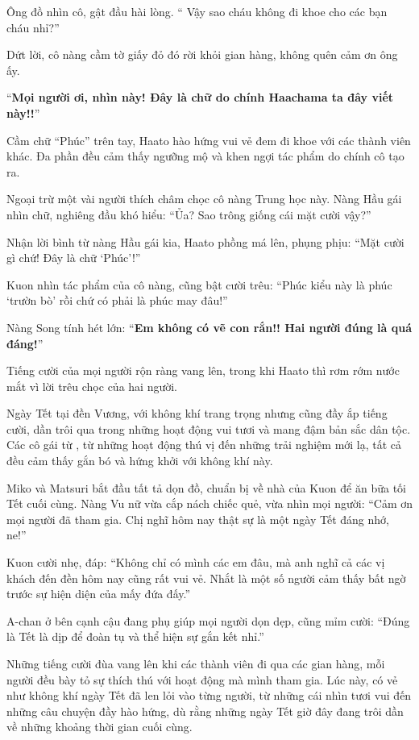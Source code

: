 \documentclass[../main.tex]{subfiles}
\begin{document}
Ông đồ nhìn cô, gật đầu hài lòng. ``{\color{red} Vậy sao cháu không đi khoe cho các bạn cháu nhỉ?}''

Dứt lời, cô nàng cầm tờ giấy đỏ đó rời khỏi gian hàng, không quên cảm ơn ông ấy.

``\textbf{Mọi người ơi, nhìn này! Đây là chữ do chính Haachama ta đây viết này!!}''

Cầm chữ ``Phúc'' trên tay, Haato hào hứng vui vẻ đem đi khoe với các thành viên khác. Đa phần đều cảm thấy ngưỡng mộ và khen ngợi tác phẩm do chính cô tạo ra.

Ngoại trừ một vài người thích châm chọc cô nàng Trung học này. Nàng Hầu gái nhìn chữ, nghiêng đầu khó hiểu: ``Ủa? Sao trông giống cái mặt cười vậy?''

Nhận lời bình từ nàng Hầu gái kia, Haato phồng má lên, phụng phịu: ``Mặt cười gì chứ! Đây là chữ `Phúc'!''

Kuon nhìn tác phẩm của cô nàng, cũng bật cười trêu: ``Phúc kiểu này là phúc `trườn bò' rồi chứ có phải là phúc may đâu!''

Nàng Song tính hét lớn: ``\textbf{Em không có vẽ con rắn!! Hai người đúng là quá đáng!}''

Tiếng cười của mọi người rộn ràng vang lên, trong khi Haato thì rơm rớm nước mắt vì lời trêu chọc của hai người.

\il

Ngày Tết tại đền Vương, với không khí trang trọng nhưng cũng đầy ắp tiếng cười, dần trôi qua trong những hoạt động vui tươi và mang đậm bản sắc dân tộc. Các cô gái từ \hll, từ những hoạt động thú vị đến những trải nghiệm mới lạ, tất cả đều cảm thấy gắn bó và hứng khởi với không khí này.

Miko và Matsuri bắt đầu tất tả dọn đồ, chuẩn bị về nhà của Kuon để ăn bữa tối Tết cuối cùng. Nàng Vu nữ vừa cắp nách chiếc quẻ, vừa nhìn mọi người: ``Cảm ơn mọi người đã tham gia. Chị nghĩ hôm nay thật sự là một ngày Tết đáng nhớ, ne!''

Kuon cười nhẹ, đáp: ``Không chỉ có mình các em đâu, mà anh nghĩ cả các vị khách đến đền hôm nay cũng rất vui vẻ. Nhắt là một số người cảm thấy bất ngờ trước sự hiện diện của mấy đứa đấy.''

A-chan ở bên cạnh cậu đang phụ giúp mọi người dọn dẹp, cũng mỉm cười: ``Đúng là Tết là dịp để đoàn tụ và thể hiện sự gắn kết nhỉ.''

Những tiếng cười đùa vang lên khi các thành viên đi qua các gian hàng, mỗi người đều bày tỏ sự thích thú với hoạt động mà mình tham gia. Lúc này, có vẻ như không khí ngày Tết đã len lỏi vào từng người, từ những cái nhìn tươi vui đến những câu chuyện đầy hào hứng, dù rằng những ngày Tết giờ đây đang trôi dần về những khoảng thời gian cuối cùng.
\end{document}
